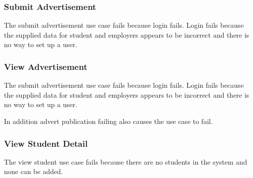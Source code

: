 \documentclass[11pt]{l3deliverable}
\begin{document}
\subsubsection{Submit Advertisement}

The submit advertisement use case fails because login fails. Login fails 
because the supplied data for student and employers appears to be incorrect and 
there is no way to set up a user.

\subsubsection{View Advertisement}

The submit advertisement use case fails because login fails. Login fails 
because the supplied data for student and employers appears to be incorrect and 
there is no way to set up a user.

In addition advert publication failing also causes the use case to fail.

\subsubsection{View Student Detail}

The view student use case fails because there are no students in the system and
none can be added.
\end{document}
